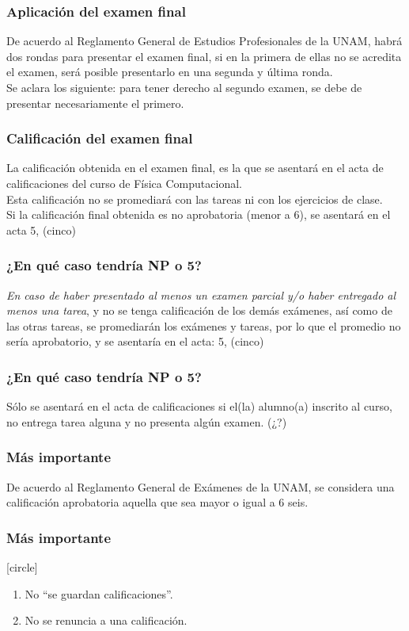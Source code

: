\begin{frame}
\frametitle{Aplicación del examen final}
De acuerdo al Reglamento General de Estudios Profesionales de la UNAM, habrá dos rondas para presentar el examen final, si en la primera de ellas no se acredita el examen, será posible presentarlo en una segunda y última ronda.
\\
\bigskip
\pause
Se aclara los siguiente: \alert{para tener derecho al segundo examen, se debe de presentar necesariamente el primero.}
\end{frame}
\begin{frame}
\frametitle{Calificación del examen final}
La calificación obtenida en el examen final, es la que se asentará en el acta de calificaciones del curso de Física Computacional.
\\
\bigskip
\pause
Esta calificación no se promediará con las tareas ni con los ejercicios de clase.
\\
\bigskip
\pause
Si la calificación final obtenida es no aprobatoria (menor a $6$), se asentará en el acta \alert{5, (cinco)}
\end{frame}
\begin{frame}
\frametitle{\textbf{¿En qué caso tendría NP o 5?}}
\emph{En caso de haber presentado al menos un examen parcial y/o haber entregado al menos una tarea}, y no se tenga calificación de los demás exámenes, así como de las otras tareas, se promediarán los exámenes y tareas, por lo que el promedio no sería aprobatorio, y se asentaría en el acta: \alert{5, (cinco)}
\end{frame}
\begin{frame}
\frametitle{\textbf{¿En qué caso tendría NP o 5?}}
Sólo se asentará en el acta de calificaciones  si el(la) alumno(a) inscrito al curso, no entrega tarea alguna y no presenta algún examen. (¿?)
\end{frame}
\begin{frame}
\frametitle{Más importante}
De acuerdo al Reglamento General de Exámenes de la UNAM, se considera una calificación aprobatoria aquella que sea mayor o igual a $6$ seis.
\end{frame}
\begin{frame}
\frametitle{Más importante}
[circle]
\begin{enumerate}[<+->]
\item No \enquote{se guardan calificaciones}.
\item No se renuncia a una calificación.
\end{enumerate}
\end{frame}
